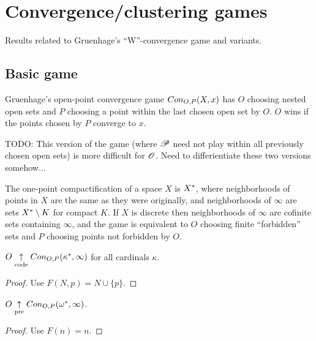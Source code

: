 
\chapter{Convergence/clustering games}

Results related to Gruenhage's ``W''-convergence game and variants.

\section{Basic game}

\begin{definition} 
Gruenhage's open-point convergence game $Con_{O,P}(X,x)$ has $O$ choosing nested open sets and $P$ choosing a point within the last chosen open set by $O$. $O$ wins if the points chosen by $P$ converge to $x$.
\end{definition}

TODO: This version of the game (where $\mathscr{P}$ need not play within all 
previously chosen open sets) is more difficult for $\mathscr{O}$. Need to 
differientiate these two versions somehow...

\begin{definition}
The one-point compactification of a space $X$ is $X^*$, where neighborhoods of points in $X$ are the same as they were originally, and neighborhoods of $\infty$ are sets $X^*\setminus K$ for compact $K$. If $X$ is discrete then neighborhoods of $\infty$ are cofinite sets containing $\infty$, and the game is equivalent to $O$ choosing finite ``forbidden'' sets and $P$ choosing points not forbidden by $O$.
\end{definition}

\begin{proposition}
$O\underset{\text{code}}{\uparrow} Con_{O,P}(\kappa^*,\infty)$ for all cardinals $\kappa$.
\end{proposition}

\begin{proof}
Use $F(N,p)=N\cup\{p\}$.
\end{proof}

\begin{proposition}
$O\underset{\text{pre}}{\uparrow} Con_{O,P}(\omega^*,\infty)$.
\end{proposition}

\begin{proof}
Use $F(n)=n$.
\end{proof}


